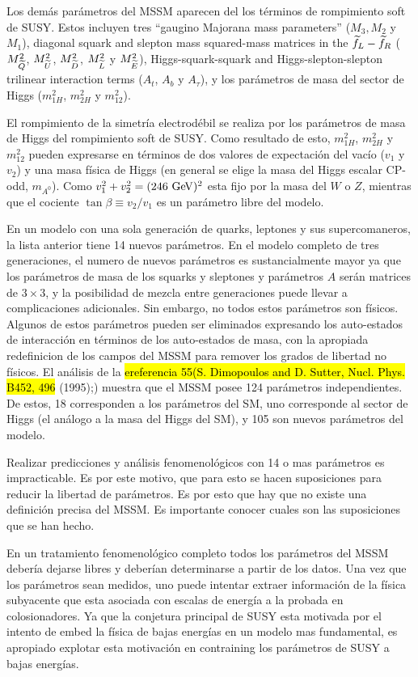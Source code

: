 Los demás parámetros del MSSM aparecen
del los términos de rompimiento soft de SUSY. Estos incluyen tres
``gaugino Majorana mass parameters'' ($M_3, M_2$ y $M_1$),
diagonal squark and slepton mass squared-mass matrices in the $\widetilde{f}_L - \widetilde{f}_R$
($M^2_{\widetilde{Q}}$, $M^2_{\widetilde{U}}$, $M^2_{\widetilde{D}}$, $M^2_{\widetilde{L}}$ y $M^2_{\widetilde{E}}$),
Higgs-squark-squark and Higgs-slepton-slepton trilinear interaction terms
($A_t$, $A_b$ y $A_\tau$), y los parámetros de masa del sector de Higgs
($m^2_{1H}$, $m^2_{2H}$ y $m^2_{12}$).

 El rompimiento de la simetría electrodébil se realiza por los parámetros de masa
 de Higgs del rompimiento soft de SUSY. Como resultado de esto, $m^2_{1H}$, $m^2_{2H}$ y $m^2_{12}$
pueden expresarse en términos de dos valores de expectación del vacío ($v_1$ y $v_2$)
y una masa física de Higgs (en general se elige la masa del Higgs escalar CP-odd, $m_{A^0}$).
Como $v_1^2+v_2^2=(246 \gev)^2$ esta fijo por la masa del $W$ o $Z$, mientras que
el cociente $\tan \beta \equiv v_2/v_1$ es un parámetro libre del modelo.

En un modelo con una sola generación de quarks, leptones y sus supercomaneros,
la lista anterior tiene 14 nuevos parámetros. En el modelo completo de tres
generaciones, el numero de nuevos parámetros es sustancialmente mayor ya que
los parámetros de masa de los squarks y sleptones  y parámetros $A$ serán
matrices de $3 \times 3$, y la posibilidad de mezcla entre generaciones puede
llevar a complicaciones adicionales. Sin embargo, no todos estos parámetros
son físicos. Algunos de estos parámetros pueden ser eliminados expresando
los auto-estados de interacción en términos de los auto-estados de masa, con la
apropiada redefinicion de los campos del MSSM para remover los grados de
libertad no físicos. El análisis de la \hl{ereferencia 55(S. Dimopoulos and D. Sutter, Nucl. Phys. B452, 496}
(1995);) muestra que el MSSM posee 124 parámetros independientes.
De estos, 18 corresponden a los parámetros del SM, uno corresponde
al sector de Higgs (el análogo a la masa del Higgs del SM), y 105 son
nuevos parámetros del modelo.

Realizar predicciones y análisis fenomenológicos con 14 o mas parámetros
es impracticable. Es por este motivo, que para esto se hacen suposiciones
para reducir la libertad de parámetros. Es por esto que hay que no existe
una definición precisa del MSSM. Es importante conocer cuales son las suposiciones
que se han hecho.

En un tratamiento fenomenológico completo todos los parámetros del MSSM
debería dejarse libres y deberían determinarse a partir de los datos. Una
vez que los parámetros sean medidos, uno puede intentar extraer información de
la física subyacente que esta asociada con escalas de energía a la probada en
colosionadores. Ya que la conjetura principal de SUSY esta motivada por el
intento de embed la física de bajas energías en un modelo mas fundamental, es
apropiado explotar esta motivación en contraining los parámetros de SUSY a
bajas energías.


